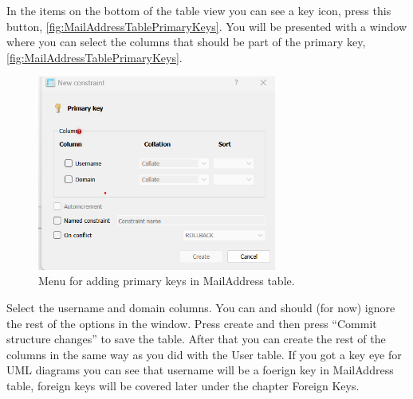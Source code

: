 \documentclass[a4paper,11pt,oneside]{article}
\begin{document}
\begin{sloppypar}
In the items on the bottom of the table view you can see a key icon, press this button, \autoref{fig:MailAddressTablePrimaryKeys}. You will be presented with a window where you can select the columns that should be part of the primary key, \autoref{fig:MailAddressTablePrimaryKeys}. 
\begin{figure}[!htb]
  \centering
  \includegraphics[width=0.7\textwidth]{sqlitestudio/create_mail_address/create_mail_blank_primary_keys.png}
  \caption{Menu for adding primary keys in MailAddress table.}
  \label{fig:MailAddressTablePrimaryKeys}
\end{figure}
Select the username and domain columns. You can and should (for now) ignore the rest of the options in the window. Press create and then press ``Commit structure changes'' to save the table. After that you can create the rest of the columns in the same way as you did with the User table. If you got a key eye for UML diagrams you can see that username will be a foerign key in MailAddress table, foreign keys will be covered later under the chapter Foreign Keys.  

\end{sloppypar}
\end{document}
